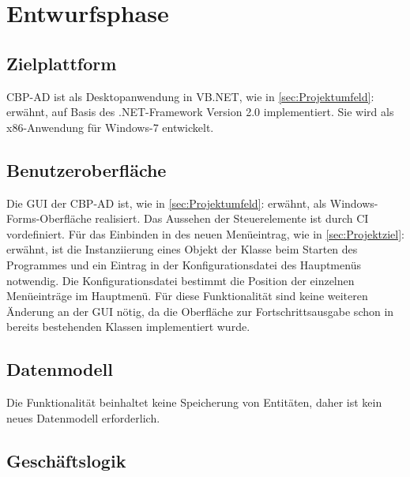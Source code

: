 
\section{Entwurfsphase} 
\label{sec:Entwurfsphase}

\subsection{Zielplattform}
\label{sec:Zielplattform}

\ac{CBP-AD} ist als Desktopanwendung in \acs{VB}.NET, wie in \ref{sec:Projektumfeld}:  erwähnt, auf Basis des .NET-Framework Version 2.0 implementiert.
Sie wird als x86-Anwendung für Windows-7 entwickelt.


\subsection{Benutzeroberfläche}
\label{sec:Benutzeroberflaeche}

Die \acs{GUI} der \ac{CBP-AD} ist, wie in \ref{sec:Projektumfeld}:  erwähnt, als Windows-Forms-Oberfläche realisiert. Das Aussehen der Steuerelemente ist durch \ac{CI} vordefiniert. Für das Einbinden in des neuen Menüeintrag, wie in \ref{sec:Projektziel}:  erwähnt, ist die Instanziierung eines Objekt der Klasse  beim Starten des Programmes und ein Eintrag in der Konfigurationsdatei des Hauptmenüs notwendig. Die Konfigurationsdatei bestimmt die Position der einzelnen Menüeinträge im Hauptmenü. Für diese Funktionalität sind keine weiteren Änderung an der \acs{GUI} nötig, da die Oberfläche zur Fortschrittsausgabe schon in bereits bestehenden Klassen implementiert wurde.


\subsection{Datenmodell}
\label{sec:Datenmodell}

Die Funktionalität \gqq{\titel} beinhaltet keine Speicherung von Entitäten, daher ist kein neues Datenmodell erforderlich.

\clearpage
\subsection{Geschäftslogik}
\label{sec:Geschaeftslogik}

